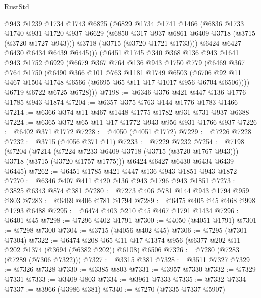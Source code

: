 \begin{lexlean}{RustStd}
\begin{coremodule}
          @943
          @1239
          @1734
          @1743
          @6825
          (@6829
            @1734
            @1741
            @1466
            (@6836
              @1733
              @1740
              @931
              @1720
              @937
              @6629
              (@6850 @317 @937 @6861 @6409 @3718 (@3715 (@3720 @1727 @943)))
              @3718
              (@3715 (@3720 @1721 @1733)))
            @6424
            @6427
            @6430
            @6434
            @6439
            @6445)))
      (@6451
        @1745
        @340
        @368
        @136
        @943
        @1641
        @943
        @1752
        @6929
        (@6679
          @367
          @764
          @136
          @943
          @1750
          @779
          (@6469
            @367
            @764
            @1750
            (@6490
              @366
              @101
              @763
              @1181
              @1749
              @6503
              (@6706 @92 @11 @467 @1504 @1748 @6566 (@6695 @65 @11 @17 @1017 @956 @6704 @6506))))
          @6719
          @6722
          @6725
          @6728)))
@7198 := @6346 @376 @421 @447 @136 @1776 @1785 @943 @1874
@7204 := @6357 @375 @763 @144 @1776 @1783 @1466
@7214 := @6366 @374 @11 @467 @1448 @1775 @1782 @931 @731 @937 @6388
@7224 := @6365 @372 @65 @11 @17 @1772 @943 @956 @931 @1766 @937
@7226 := @6402 @371 @1772
@7228 := @4050 (@4051 @1772)
@7229 := @7226 @7228
@7232 := @3715 (@4056 @371 @11)
@7233 := @7229 @7232
@7254 := @7198
    (@7204
      (@7214 (@7224 @7233 @6409 @3718 (@3715 (@3720 @1767 @943))) @3718 (@3715 (@3720 @1757 @1775)))
      @6424
      @6427
      @6430
      @6434
      @6439
      @6445)
@7262 := @6451 @1785 @421 @447 @136 @943 @1851 @943 @1872
@7270 := @6346 @407 @411 @420 @136 @943 @1796 @943 @1851
@7273 := @3825 @6343 @874 @381
@7280 := @7273 @406 @781 @144 @943 @1794 @959 @803
@7283 := @6469 @406 @781 @1794
@7289 := @6475 @405 @45 @468 @998 @1793 @6488
@7295 := @6474 @403 @210 @45 @467 @1791 @1434
@7296 := @6401 @45
@7298 := @7296 @402 @1791
@7300 := @4050 (@4051 @1791)
@7301 := @7298 @7300
@7304 := @3715 (@4056 @402 @45)
@7306 := @7295 (@7301 @7304)
@7322 := @6474
    @208
    @65
    @11
    @17
    @1374
    @956
    (@6377 @202 @11 @202 @1374 (@3694 (@6382 @202)) @6108)
    @6506
@7326 := @7280 (@7283 (@7289 (@7306 @7322)))
@7327 := @3315 @381
@7328 := @3511 @7327
@7329 := @7326 @7328
@7330 := @3385 @803
@7331 := @3957 @7330
@7332 := @7329 @7331
@7333 := @3409 @803
@7334 := @3961 @7333
@7335 := @7332 @7334
@7337 := @3966 (@3986 @381)
@7340 := @7270 (@7335 @7337 @5907)

\end{coremodule}
\end{lexlean}
